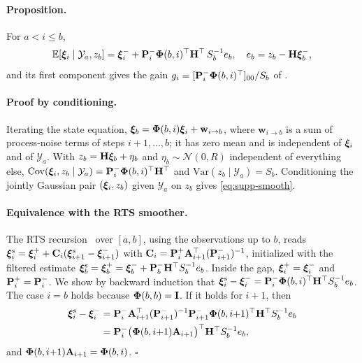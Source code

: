 \paragraph{Proposition.}
For $a<i\le b$,
\begin{equation}
  \mathbb{E}\!\left[\bm{\xi}_i\mid\mathcal Y_a,z_b\right]=\bm{\xi}^{-}_i+\mathbf{P}^{-}_i\bm{\Phi}(b,i)^\top\mathbf H^\top\,S_b^{-1}e_b,
  \quad e_b=z_b-\mathbf H\bm{\xi}^{-}_b,
  \label{eq:supp-smooth}
\end{equation}
and its first component gives the gain $g_i=[\mathbf{P}^{-}_i\bm{\Phi}(b,i)^\top]_{00}/S_b$ of .

\paragraph{Proof by conditioning.}
Iterating the state equation, $\bm{\xi}_b=\bm{\Phi}(b,i)\bm{\xi}_i+\mathbf w_{i\to b}$, where $\mathbf w_{i\to b}$ is a sum of
process-noise terms of steps $i+1,\dots,b$; it has zero mean and is independent of $\bm{\xi}_i$ and of $\mathcal Y_a$.
With $z_b=\mathbf H\bm{\xi}_b+\eta_b$ and $\eta_b\sim\mathcal N(0,R)$ independent of everything else,
$\mathrm{Cov}(\bm{\xi}_i,z_b\mid\mathcal Y_a)=\mathbf{P}^{-}_i\bm{\Phi}(b,i)^\top\mathbf H^\top$ and
$\mathrm{Var}(z_b\mid\mathcal Y_a)=S_b$. Conditioning the jointly Gaussian pair $(\bm{\xi}_i,z_b)$ given $\mathcal Y_a$
on $z_b$ gives \eqref{eq:supp-smooth}.

\paragraph{Equivalence with the RTS smoother.}
The RTS recursion~\cite{rauch1965maximum,sarkka2013bayesian} over $[a,b]$, using the observations up to $b$, reads
$\bm{\xi}^{\mathrm{s}}_i=\bm{\xi}^{+}_i+\mathbf C_i(\bm{\xi}^{\mathrm{s}}_{i+1}-\bm{\xi}^{-}_{i+1})$ with
$\mathbf C_i=\mathbf{P}^{+}_i\mathbf{A}_{i+1}^\top(\mathbf{P}^{-}_{i+1})^{-1}$, initialized with the filtered estimate
$\bm{\xi}^{\mathrm{s}}_b=\bm{\xi}^{+}_b=\bm{\xi}^{-}_b+\mathbf{P}^{-}_b\mathbf H^\top S_b^{-1}e_b$. Inside the gap,
$\bm{\xi}^{+}_i=\bm{\xi}^{-}_i$ and $\mathbf{P}^{+}_i=\mathbf{P}^{-}_i$. We show by backward induction that
$\bm{\xi}^{\mathrm{s}}_i-\bm{\xi}^{-}_i=\mathbf{P}^{-}_i\bm{\Phi}(b,i)^\top\mathbf H^\top S_b^{-1}e_b$. The case $i=b$ holds because
$\bm{\Phi}(b,b)=\mathbf I$. If it holds for $i+1$, then
\begin{align*}
  \bm{\xi}^{\mathrm{s}}_i-\bm{\xi}^{-}_i
  &=\mathbf{P}^{-}_i\mathbf{A}_{i+1}^\top(\mathbf{P}^{-}_{i+1})^{-1}\mathbf{P}^{-}_{i+1}\bm{\Phi}(b,i{+}1)^\top\mathbf H^\top S_b^{-1}e_b\\
  &=\mathbf{P}^{-}_i\big(\bm{\Phi}(b,i{+}1)\mathbf{A}_{i+1}\big)^\top\mathbf H^\top S_b^{-1}e_b,
\end{align*}
and $\bm{\Phi}(b,i{+}1)\mathbf{A}_{i+1}=\bm{\Phi}(b,i)$. \hfill$\square$

